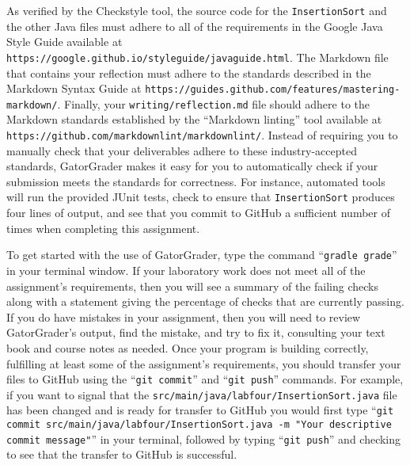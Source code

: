 \documentclass[11pt]{article}
\newcommand{\mainprogram}{\lstinline{InsertionSort}}
\newcommand{\mainprogramsource}{\lstinline{src/main/java/labfour/InsertionSort.java}}
\newcommand{\mainprogramoutput}{four}
\newcommand{\reflection}{\lstinline{writing/reflection.md}}
\newcommand{\gatorgraderstart}{\command{gradle grade}}
\newcommand{\gitcommit}{\command{git commit}}
\newcommand{\gitpush}{\command{git push}}
\newcommand{\gitcommitmainprogram}{\command{git commit src/main/java/labfour/InsertionSort.java -m "Your
descriptive commit message"}}
\newcommand{\command}[1]{``\lstinline{#1}''}
\newcommand{\url}[1]{\lstinline{#1}}
\newcommand{\step}[1]{``{#1}''}
\begin{document}
As verified by the Checkstyle tool, the source code for the \mainprogram{} and
the other Java files must adhere to all of the requirements in the Google Java
Style Guide available at
\url{https://google.github.io/styleguide/javaguide.html}. The Markdown file that
contains your reflection must adhere to the standards described in the Markdown
Syntax Guide at \url{https://guides.github.com/features/mastering-markdown/}.
Finally, your \reflection{} file should adhere to the Markdown standards
established by the \step{Markdown linting} tool available at
\url{https://github.com/markdownlint/markdownlint/}. Instead of requiring you to
manually check that your deliverables adhere to these industry-accepted
standards, GatorGrader makes it easy for you to automatically check if your
submission meets the standards for correctness. For instance, automated tools
will run the provided JUnit tests, check to ensure that \mainprogram{} produces
\mainprogramoutput{} lines of output, and see that you commit to GitHub a
sufficient number of times when completing this assignment.

To get started with the use of GatorGrader, type the command
\gatorgraderstart{} in your terminal window. If your laboratory work does not
meet all of the assignment's requirements, then you will see a summary of the
failing checks along with a statement giving the percentage of checks that are
currently passing. If you do have mistakes in your assignment, then you will
need to review GatorGrader's output, find the mistake, and try to fix it,
consulting your text book and course notes as needed. Once your program is
building correctly, fulfilling at least some of the assignment's requirements,
you should transfer your files to GitHub using the \gitcommit{} and \gitpush{}
commands. For example, if you want to signal that the \mainprogramsource{} file
has been changed and is ready for transfer to GitHub you would first type
\gitcommitmainprogram{} in your terminal, followed by typing \gitpush{} and
checking to see that the transfer to GitHub is successful.
\end{document}
